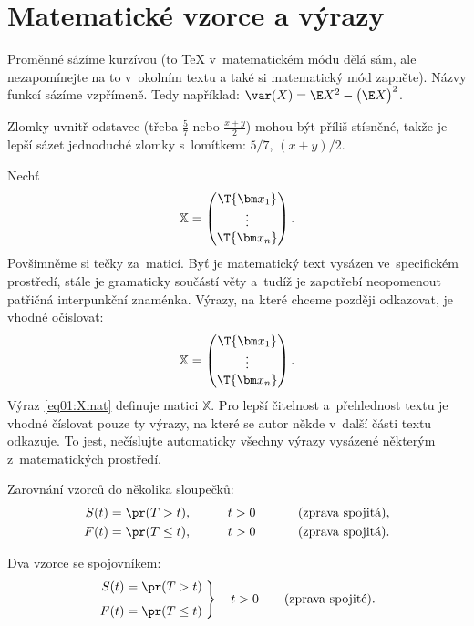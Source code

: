 \section{Matematické vzorce a výrazy}

Proměnné sázíme kurzívou (to \TeX{} v~matematickém módu dělá sám, ale
nezapomínejte na to v~okolním textu a také si matematický mód zapněte).
Názvy funkcí sázíme vzpřímeně. Tedy například:
$\var(X) = \E X^2 - \bigl(\E X \bigr)^2$.

Zlomky uvnitř odstavce (třeba $\frac{5}{7}$ nebo $\frac{x+y}{2}$) mohou
být příliš stísněné, takže je lepší sázet jednoduché zlomky s~lomítkem:
$5/7$, $(x+y)/2$.

Nechť
\[   %
\mathbb{X} = \begin{pmatrix}
      \T{\bm x_1} \\
      \vdots \\
      \T{\bm x_n}
      \end{pmatrix}.
\]
Povšimněme si tečky za~maticí. Byť je matematický text vysázen
ve~specifickém prostředí, stále je gramaticky součástí věty a~tudíž je
zapotřebí neopomenout patřičná interpunkční znaménka. Výrazy, na které
chceme později odkazovat, je vhodné očíslovat:
\begin{equation}\label{eq01:Xmat}
\mathbb{X} = \begin{pmatrix}
      \T{\bm x_1} \\
      \vdots \\
      \T{\bm x_n}
      \end{pmatrix}.
\end{equation}
Výraz \eqref{eq01:Xmat} definuje matici $\mathbb{X}$. Pro lepší čitelnost
a~přehlednost textu je vhodné číslovat pouze ty výrazy, na které se
autor někde v~další části textu odkazuje. To jest, nečíslujte
automaticky všechny výrazy vysázené některým z~matematických
prostředí.

Zarovnání vzorců do několika sloupečků:
\begin{alignat*}{3}
S(t) &= \pr(T > t),    &\qquad t&>0       &\qquad&\text{ (zprava spojitá),}\\
F(t) &= \pr(T \leq t), &\qquad t&>0       &\qquad&\text{ (zprava spojitá).}
\end{alignat*}

Dva vzorce se spojovníkem:
\begin{equation}\label{eq01:FS}
\left.
\begin{aligned}
S(t) &= \pr(T > t) \\[1ex]
F(t) &= \pr(T \leq t)
\end{aligned}
\;	%
\right\}
\quad t>0 \qquad \text{(zprava spojité).}
\end{equation}

